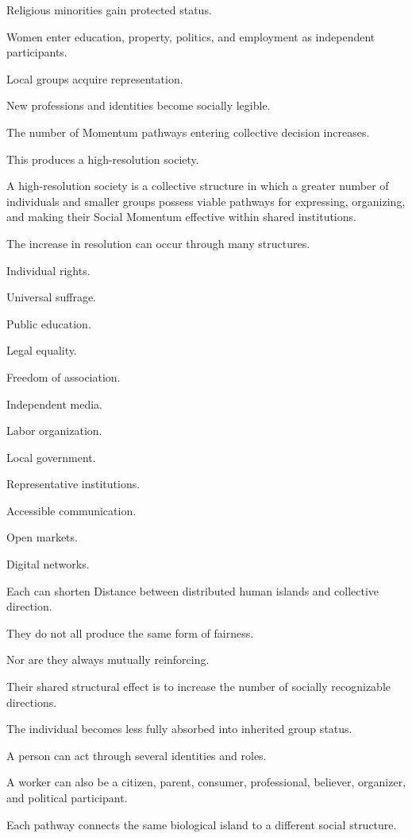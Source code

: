 Religious minorities gain protected status.

Women enter education, property, politics, and employment as independent participants.

Local groups acquire representation.

New professions and identities become socially legible.

The number of Momentum pathways entering collective decision increases.

This produces a high-resolution society.

A high-resolution society is a collective structure in which a greater number of individuals and smaller groups possess viable pathways for expressing, organizing, and making their Social Momentum effective within shared institutions.

The increase in resolution can occur through many structures.

Individual rights.

Universal suffrage.

Public education.

Legal equality.

Freedom of association.

Independent media.

Labor organization.

Local government.

Representative institutions.

Accessible communication.

Open markets.

Digital networks.

Each can shorten Distance between distributed human islands and collective direction.

They do not all produce the same form of fairness.

Nor are they always mutually reinforcing.

Their shared structural effect is to increase the number of socially recognizable directions.

The individual becomes less fully absorbed into inherited group status.

A person can act through several identities and roles.

A worker can also be a citizen, parent, consumer, professional, believer, organizer, and political participant.

Each pathway connects the same biological island to a different social structure.

